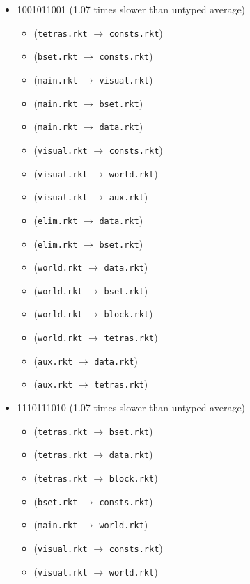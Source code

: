 \documentclass{article}
\newcommand{\mono}[1]{\texttt{#1}}
\begin{document}
\begin{itemize}
\item 1001011001 (1.07 times slower than untyped average)
  \begin{itemize}
  \item (\mono{tetras.rkt} $\rightarrow$ \mono{consts.rkt})
  \item (\mono{bset.rkt} $\rightarrow$ \mono{consts.rkt})
  \item (\mono{main.rkt} $\rightarrow$ \mono{visual.rkt})
  \item (\mono{main.rkt} $\rightarrow$ \mono{bset.rkt})
  \item (\mono{main.rkt} $\rightarrow$ \mono{data.rkt})
  \item (\mono{visual.rkt} $\rightarrow$ \mono{consts.rkt})
  \item (\mono{visual.rkt} $\rightarrow$ \mono{world.rkt})
  \item (\mono{visual.rkt} $\rightarrow$ \mono{aux.rkt})
  \item (\mono{elim.rkt} $\rightarrow$ \mono{data.rkt})
  \item (\mono{elim.rkt} $\rightarrow$ \mono{bset.rkt})
  \item (\mono{world.rkt} $\rightarrow$ \mono{data.rkt})
  \item (\mono{world.rkt} $\rightarrow$ \mono{bset.rkt})
  \item (\mono{world.rkt} $\rightarrow$ \mono{block.rkt})
  \item (\mono{world.rkt} $\rightarrow$ \mono{tetras.rkt})
  \item (\mono{aux.rkt} $\rightarrow$ \mono{data.rkt})
  \item (\mono{aux.rkt} $\rightarrow$ \mono{tetras.rkt})
  \end{itemize}
\item 1110111010 (1.07 times slower than untyped average)
  \begin{itemize}
  \item (\mono{tetras.rkt} $\rightarrow$ \mono{bset.rkt})
  \item (\mono{tetras.rkt} $\rightarrow$ \mono{data.rkt})
  \item (\mono{tetras.rkt} $\rightarrow$ \mono{block.rkt})
  \item (\mono{bset.rkt} $\rightarrow$ \mono{consts.rkt})
  \item (\mono{main.rkt} $\rightarrow$ \mono{world.rkt})
  \item (\mono{visual.rkt} $\rightarrow$ \mono{consts.rkt})
  \item (\mono{visual.rkt} $\rightarrow$ \mono{world.rkt})

\end{itemize}
\end{itemize}
\end{document}
